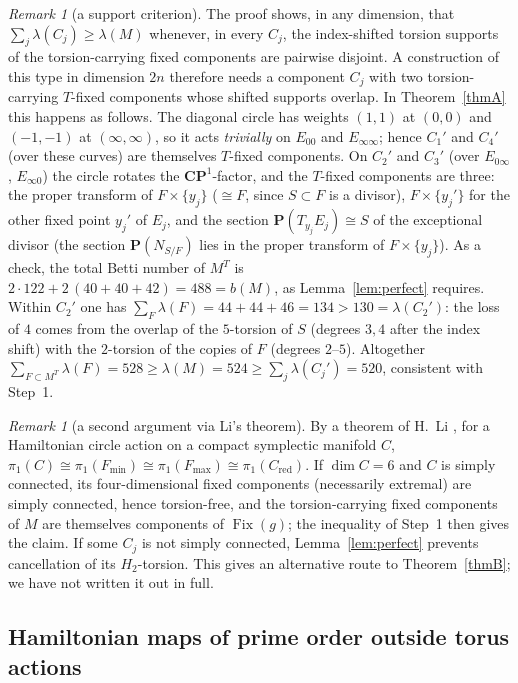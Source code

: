 \documentclass[11pt]{amsart}
\numberwithin{equation}{section}
\theoremstyle{definition}
\theoremstyle{remark}
\newtheorem{remark}[theorem]{Remark}
\newcommand{\CP}{\mathbf{CP}}
\newcommand{\PP}{\mathbf P}
\DeclareMathOperator{\Fix}{Fix}
\begin{document}
\begin{remark}[a support criterion]\label{rem:support}
The proof shows, in any dimension, that $\sum_j\lambda(C_j)\ge\lambda(M)$
whenever, in every $C_j$, the index-shifted torsion supports of the
torsion-carrying fixed components are pairwise disjoint. A construction of
this type in dimension $2n$ therefore needs a component $C_j$ with two
torsion-carrying $T$-fixed components whose shifted supports overlap.
In Theorem~\ref{thmA} this happens as follows. The diagonal circle
has weights $(1,1)$ at $(0,0)$ and $(-1,-1)$ at $(\infty,\infty)$, so it
acts \emph{trivially} on $E_{00}$ and $E_{\infty\infty}$; hence $C_1'$ and
$C_4'$ (over these curves) are themselves $T$-fixed components. On $C_2'$
and $C_3'$ (over $E_{0\infty}$, $E_{\infty0}$) the circle rotates the
$\CP^1$-factor, and the $T$-fixed components are three: the proper
transform of $F\times\{y_j\}$ ($\cong F$, since $S\subset F$ is a divisor),
$F\times\{y_j'\}$ for the other fixed point $y_j'$ of $E_j$, and the
section $\PP(T_{y_j}E_j)\cong S$ of the exceptional divisor (the section
$\PP(N_{S/F})$ lies in the proper transform of $F\times\{y_j\}$). As a
check, the total Betti number of $M^T$ is
$2\cdot122+2\,(40+40+42)=488=b(M)$, as Lemma~\ref{lem:perfect} requires.
Within $C_2'$ one has $\sum_F\lambda(F)=44+44+46=134>130=\lambda(C_2')$:
the loss of $4$ comes from the overlap of the $5$-torsion of $S$ (degrees
$3,4$ after the index shift) with the $2$-torsion of the copies of $F$
(degrees $2$--$5$). Altogether $\sum_{F\subset M^T}\lambda(F)=528\ge
\lambda(M)=524\ge\sum_j\lambda(C_j')=520$, consistent with Step~1.
\end{remark}

\begin{remark}[a second argument via Li's theorem]
By a theorem of H.~Li \cite[Thm.~0.1]{Li2003}, for a Hamiltonian circle
action on a compact symplectic manifold $C$,
$\pi_1(C)\cong\pi_1(F_{\min})\cong\pi_1(F_{\max})\cong\pi_1(C_{\mathrm{red}})$. If $\dim C=6$ and $C$ is simply
connected, its four-dimensional fixed components (necessarily extremal)
are simply connected, hence torsion-free, and the torsion-carrying
fixed components of $M$ are themselves components of $\Fix(g)$; the
inequality of Step~1 then gives the claim. If some $C_j$ is not simply
connected, Lemma~\ref{lem:perfect} prevents cancellation of its
$H_2$-torsion. This gives an alternative route to Theorem~\ref{thmB}; we
have not written it out in full.
\end{remark}

\subsection{Hamiltonian maps of prime order outside torus actions}\label{subsec:primeorder}
\end{document}
